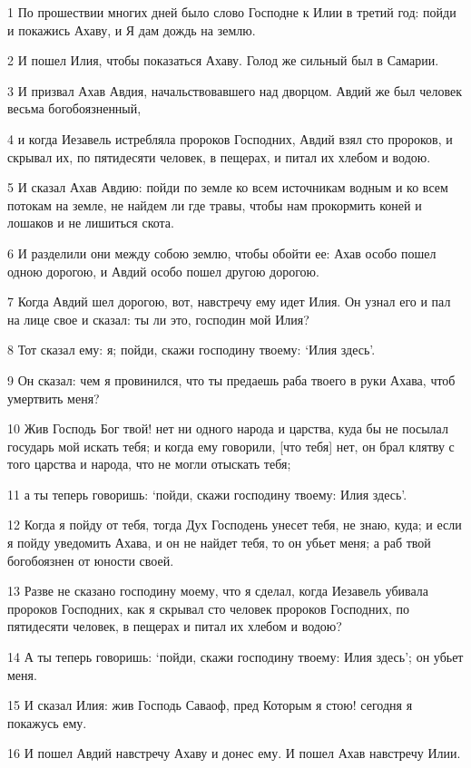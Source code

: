 \par 1 По прошествии многих дней было слово Господне к Илии в третий год: пойди и покажись Ахаву, и Я дам дождь на землю.
\par 2 И пошел Илия, чтобы показаться Ахаву. Голод же сильный был в Самарии.
\par 3 И призвал Ахав Авдия, начальствовавшего над дворцом. Авдий же был человек весьма богобоязненный,
\par 4 и когда Иезавель истребляла пророков Господних, Авдий взял сто пророков, и скрывал их, по пятидесяти человек, в пещерах, и питал их хлебом и водою.
\par 5 И сказал Ахав Авдию: пойди по земле ко всем источникам водным и ко всем потокам на земле, не найдем ли где травы, чтобы нам прокормить коней и лошаков и не лишиться скота.
\par 6 И разделили они между собою землю, чтобы обойти ее: Ахав особо пошел одною дорогою, и Авдий особо пошел другою дорогою.
\par 7 Когда Авдий шел дорогою, вот, навстречу ему идет Илия. Он узнал его и пал на лице свое и сказал: ты ли это, господин мой Илия?
\par 8 Тот сказал ему: я; пойди, скажи господину твоему: `Илия здесь'.
\par 9 Он сказал: чем я провинился, что ты предаешь раба твоего в руки Ахава, чтоб умертвить меня?
\par 10 Жив Господь Бог твой! нет ни одного народа и царства, куда бы не посылал государь мой искать тебя; и когда ему говорили, [что тебя] нет, он брал клятву с того царства и народа, что не могли отыскать тебя;
\par 11 а ты теперь говоришь: `пойди, скажи господину твоему: Илия здесь'.
\par 12 Когда я пойду от тебя, тогда Дух Господень унесет тебя, не знаю, куда; и если я пойду уведомить Ахава, и он не найдет тебя, то он убьет меня; а раб твой богобоязнен от юности своей.
\par 13 Разве не сказано господину моему, что я сделал, когда Иезавель убивала пророков Господних, как я скрывал сто человек пророков Господних, по пятидесяти человек, в пещерах и питал их хлебом и водою?
\par 14 А ты теперь говоришь: `пойди, скажи господину твоему: Илия здесь'; он убьет меня.
\par 15 И сказал Илия: жив Господь Саваоф, пред Которым я стою! сегодня я покажусь ему.
\par 16 И пошел Авдий навстречу Ахаву и донес ему. И пошел Ахав навстречу Илии.
